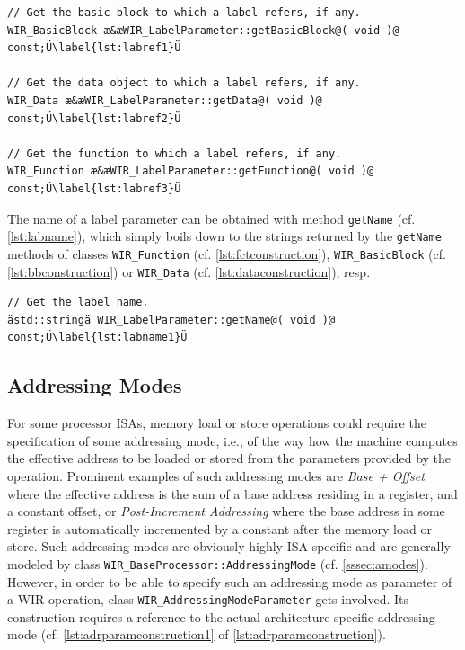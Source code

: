 \begin{lstlisting}[style=code,float=t,caption={Reference Handling of Class \texttt{WIR\_LabelParameter}},label=lst:labref]
// Get the basic block to which a label refers, if any.
WIR_BasicBlock æ&æWIR_LabelParameter::getBasicBlock@( void )@ const;Ü\label{lst:labref1}Ü

// Get the data object to which a label refers, if any.
WIR_Data æ&æWIR_LabelParameter::getData@( void )@ const;Ü\label{lst:labref2}Ü

// Get the function to which a label refers, if any.
WIR_Function æ&æWIR_LabelParameter::getFunction@( void )@ const;Ü\label{lst:labref3}Ü
\end{lstlisting}

The name of a label parameter can be obtained with method \texttt{getName} (cf. \cref{lst:labname}), which simply boils down to the strings returned by the \texttt{getName} methods of classes \texttt{WIR\_Function} (cf. \cref{lst:fctconstruction}), \texttt{WIR\_BasicBlock} (cf. \cref{lst:bbconstruction}) or \texttt{WIR\_Data} (cf.  \cref{lst:dataconstruction}), resp.

\begin{lstlisting}[style=code,float=ht,caption={Name Handling of Class \texttt{WIR\_LabelParameter}},label=lst:labname]
// Get the label name.
ästd::stringä WIR_LabelParameter::getName@( void )@ const;Ü\label{lst:labname1}Ü
\end{lstlisting}


\subsection{Addressing Modes}
\label{ssec:admodeparams}

For some processor \glspl{ISA}, memory load or store operations could require the specification of some addressing mode, i.e., of the way how the machine computes the effective address to be loaded or stored from the parameters provided by the operation.
Prominent examples of such addressing modes are \emph{Base + Offset} where the effective address is the sum of a base address residing in a register, and a constant offset, or \emph{Post-Increment Addressing} where the base address in some register is automatically incremented by a constant after the memory load or store.
Such addressing modes are obviously highly \gls{ISA}-specific and are generally modeled by class \texttt{WIR\_BaseProcessor::AddressingMode} (cf. \cref{sssec:amodes}).
However, in order to be able to specify such an addressing mode as parameter of a \gls{WIR} operation, class \texttt{WIR\_AddressingModeParameter} gets involved.
Its construction requires a reference to the actual architecture-specific addressing mode (cf. \cref{lst:adrparamconstruction1} of \cref{lst:adrparamconstruction}).

